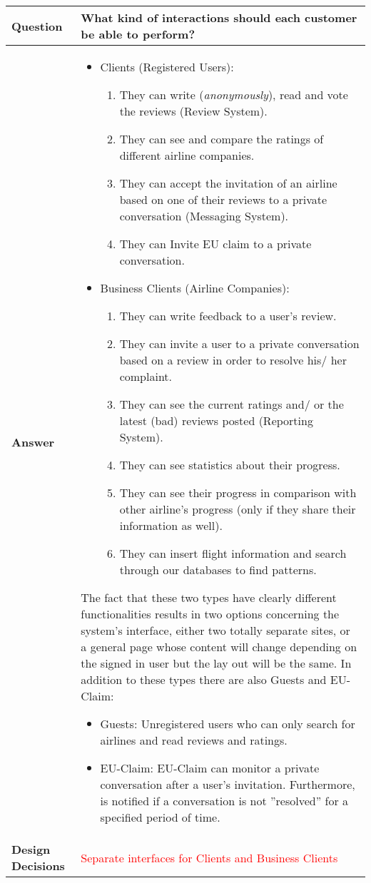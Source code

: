 \clearpage
\begin{longtable}{| l |  p{12cm} |}
\hline
\textbf{Question} & \textbf{What kind of interactions should each customer be able to perform?} \\ \hline
\textbf{Answer} &\begin{itemize}
\item Clients (Registered Users):
	\begin{enumerate}
		\item They can write ({\em anonymously}), read and vote the reviews (Review System).
       		 \item They can see and compare the ratings of different airline companies.
        	\item They can accept the invitation of an airline based on one of their reviews to a private conversation (Messaging System). 
		\item They can Invite EU claim to a private conversation.
	\end{enumerate}
\item Business Clients (Airline Companies):
	\begin{enumerate}
		\item They can write feedback to a user's review.
		\item They can invite a user to a private conversation based on a review in order to resolve his/ her complaint.
		\item They can see the current ratings and/ or the latest (bad) reviews posted (Reporting System).
		\item They can see statistics about their progress.
		\item They can see their progress in comparison with other airline's progress (only if they share their information as well).
		\item They can insert flight information and search through our databases to find patterns.
	\end{enumerate}
\end{itemize} 
The fact that these two types have clearly different functionalities results in two options concerning the system's interface, either two totally separate sites, or a general page whose content will change depending on the signed in user but the lay out will be the same.
In addition to these types there are also Guests and EU-Claim:
	\begin{itemize}
 	\item Guests: Unregistered users who can only search for airlines and read reviews and ratings.
 	\item EU-Claim: EU-Claim can monitor a private conversation after a user's invitation. Furthermore, is notified if a conversation is not ''resolved'' for a specified period of time.
	\end{itemize}
\\ \hline
\textbf{Design Decisions} & \textcolor{red}{Separate interfaces for Clients and Business Clients} \\ \hline
\end{longtable}



